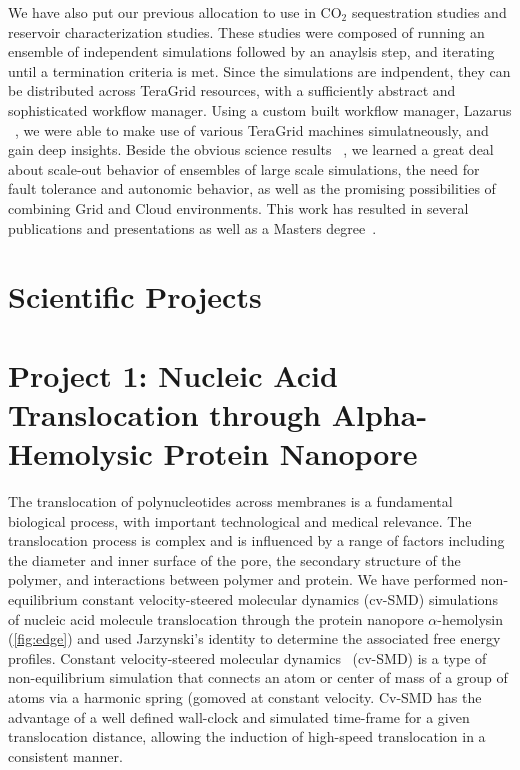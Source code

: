 \documentclass[a4paper,10pt]{article}
\begin{document}

We have also put our previous allocation to use in CO$_2$ sequestration studies
and reservoir characterization studies. These studies were composed of running an ensemble
of independent simulations followed by an anaylsis step, and iterating until a termination criteria is met.
Since the simulations are indpendent, they can be distributed across TeraGrid resources, with
a sufficiently abstract and sophisticated workflow manager. Using a custom built workflow manager,
Lazarus ~\cite{gmac}, we were able to make use of various TeraGrid machines simulatneously, and
gain deep insights. Beside the obvious science results ~\cite{TG10yye00}, we learned a great
deal about scale-out behavior of ensembles of large scale simulations, the need for fault
tolerance and autonomic behavior, as well as the promising possibilities of combining
Grid and Cloud environments. This work has resulted in several publications \cite{Cloud1,Cloud2,MSEScience,TG10yye00}  and presentations
as well as a Masters degree~\cite{Elkhamra2009}.


\section{Scientific Projects}



\section*{Project 1: Nucleic Acid Translocation through Alpha-Hemolysic Protein Nanopore}

The translocation of polynucleotides across membranes is a fundamental biological process, with important technological and medical relevance.  The translocation process is complex and is influenced by a range of factors including the diameter and inner surface of the pore, the secondary structure of the polymer, and interactions between polymer and protein. We have performed non-equilibrium constant velocity-steered molecular dynamics (cv-SMD) simulations of nucleic acid molecule translocation through the protein nanopore $\alpha$-hemolysin (\ref{fig:edge}) and used Jarzynski's identity%
to determine the associated free energy profiles. Constant velocity-steered molecular dynamics~\cite{namd} (cv-SMD) is a type of non-equilibrium simulation that connects an atom or center of mass of a group of atoms via a harmonic spring (gomoved at constant velocity. Cv-SMD has the advantage of a well defined wall-clock and simulated time-frame for a given translocation distance, allowing the induction of high-speed translocation in a consistent manner.
\end{document}
